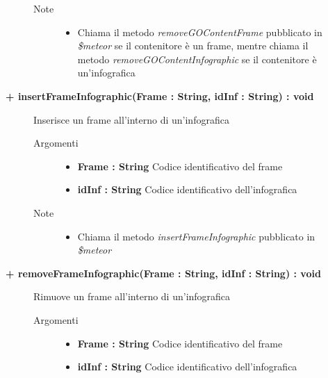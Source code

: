 \begin{description}
\begin{description}
\begin{description}
\begin{itemize}
				\end{itemize}
			\item[Note] \hfill
			\begin{itemize}
					\item Chiama il metodo \textit{removeGOContentFrame} pubblicato in \textit{\$meteor} se il contenitore è un frame, mentre chiama il metodo \textit{removeGOContentInfographic} se il contenitore è un'infografica
			\end{itemize}
		\end{description}
	\end{description}
	
	\begin{description}
		\item[\textbf{\color{blue}+ insertFrameInfographic(Frame : String, idInf : String) : void			}] \hfill
			Inserisce un frame all'interno di un'infografica
			
		\begin{description}
			\item[Argomenti] \hfill
				\begin{itemize}
					\item \textbf{Frame : String			} \hfill
					Codice identificativo del frame
					\item \textbf{idInf : String			} \hfill
					Codice identificativo dell'infografica
					
				\end{itemize}
			\item[Note] \hfill
			\begin{itemize}
					\item Chiama il metodo \textit{insertFrameInfographic} pubblicato in \textit{\$meteor}
			\end{itemize}
		\end{description}
	\end{description}
	
	\begin{description}
		\item[\textbf{\color{blue}+ removeFrameInfographic(Frame : String, idInf : String) : void			}] \hfill
			Rimuove un frame all'interno di un'infografica
			
		\begin{description}
			\item[Argomenti] \hfill
				\begin{itemize}
					\item \textbf{Frame : String			} \hfill
					Codice identificativo del frame
					\item \textbf{idInf : String			} \hfill
					Codice identificativo dell'infografica
					

\end{itemize}
\end{description}
\end{description}
\end{description}
